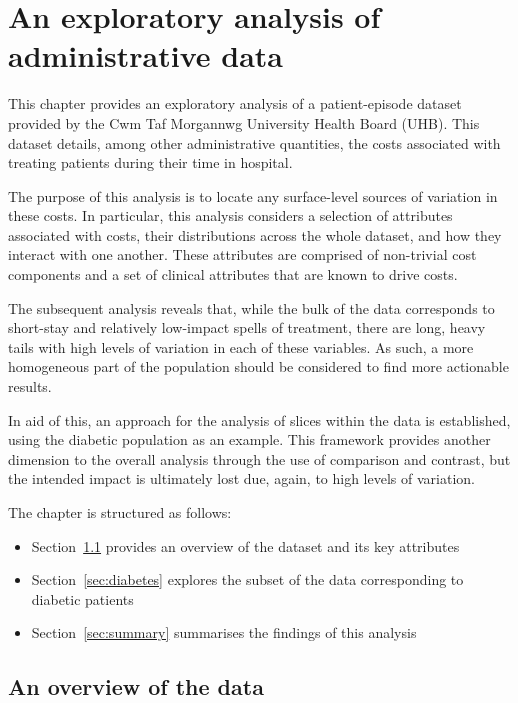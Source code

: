 \chapter{An exploratory analysis of administrative data}
\label{chp:data}

\renewcommand{\texpath}{chapters/data/paper/tex}

This chapter provides an exploratory analysis of a patient-episode dataset
provided by the Cwm Taf Morgannwg University Health Board (UHB). This dataset
details, among other administrative quantities, the costs associated with
treating patients during their time in hospital.

The purpose of this analysis is to locate any surface-level sources of variation
in these costs. In particular, this analysis considers a selection of attributes
associated with costs, their distributions across the whole dataset, and how
they interact with one another. These attributes are comprised of non-trivial
cost components and a set of clinical attributes that are known to drive costs.

The subsequent analysis reveals that, while the bulk of the data corresponds to
short-stay and relatively low-impact spells of treatment, there are long, heavy
tails with high levels of variation in each of these variables. As such, a more
homogeneous part of the population should be considered to find more actionable
results.

In aid of this, an approach for the analysis of slices within the data is
established, using the diabetic population as an example. This framework
provides another dimension to the overall analysis through the use of comparison
and contrast, but the intended impact is ultimately lost due, again, to high
levels of variation.

The chapter is structured as follows:
\begin{itemize}
    \item Section~\ref{sec:overview} provides an overview of the dataset and
        its key attributes
    \item Section~\ref{sec:diabetes} explores the subset of the data
        corresponding to diabetic patients
    \item Section~\ref{sec:summary} summarises the findings of this analysis
\end{itemize}

\section{An overview of the data}\label{sec:overview}
\graphicspath{{chapters/data/paper/img/external/}}

